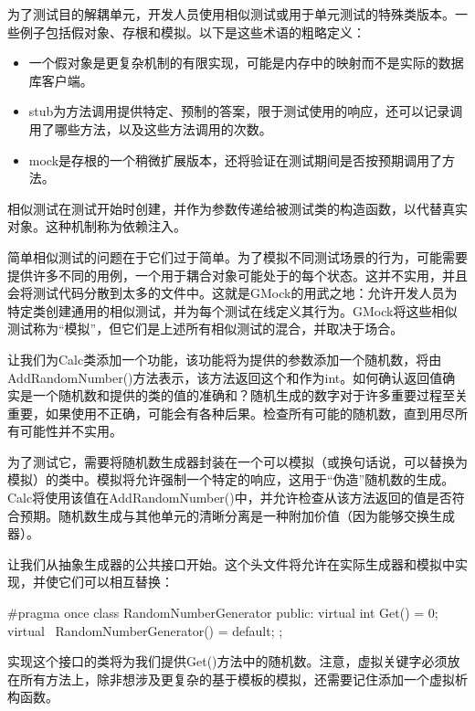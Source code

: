 为了测试目的解耦单元，开发人员使用相似测试或用于单元测试的特殊类版本。一些例子包括假对象、存根和模拟。以下是这些术语的粗略定义：

\begin{itemize}
\item
一个假对象是更复杂机制的有限实现，可能是内存中的映射而不是实际的数据库客户端。

\item
stub为方法调用提供特定、预制的答案，限于测试使用的响应，还可以记录调用了哪些方法，以及这些方法调用的次数。

\item
mock是存根的一个稍微扩展版本，还将验证在测试期间是否按预期调用了方法。
\end{itemize}

相似测试在测试开始时创建，并作为参数传递给被测试类的构造函数，以代替真实对象。这种机制称为依赖注入。

简单相似测试的问题在于它们过于简单。为了模拟不同测试场景的行为，可能需要提供许多不同的用例，一个用于耦合对象可能处于的每个状态。这并不实用，并且会将测试代码分散到太多的文件中。这就是GMock的用武之地：允许开发人员为特定类创建通用的相似测试，并为每个测试在线定义其行为。GMock将这些相似测试称为“模拟”，但它们是上述所有相似测试的混合，并取决于场合。

让我们为Calc类添加一个功能，该功能将为提供的参数添加一个随机数，将由AddRandomNumber()方法表示，该方法返回这个和作为int。如何确认返回值确实是一个随机数和提供的类的值的准确和？随机生成的数字对于许多重要过程至关重要，如果使用不正确，可能会有各种后果。检查所有可能的随机数，直到用尽所有可能性并不实用。

为了测试它，需要将随机数生成器封装在一个可以模拟（或换句话说，可以替换为模拟）的类中。模拟将允许强制一个特定的响应，这用于“伪造”随机数的生成。Calc将使用该值在AddRandomNumber()中，并允许检查从该方法返回的值是否符合预期。随机数生成与其他单元的清晰分离是一种附加价值（因为能够交换生成器）。

让我们从抽象生成器的公共接口开始。这个头文件将允许在实际生成器和模拟中实现，并使它们可以相互替换：


\begin{cmake}
#pragma once
class RandomNumberGenerator {
    public:
    virtual int Get() = 0;
    virtual ~RandomNumberGenerator() = default;
};
\end{cmake}

实现这个接口的类将为我们提供Get()方法中的随机数。注意，虚拟关键字必须放在所有方法上，除非想涉及更复杂的基于模板的模拟，还需要记住添加一个虚拟析构函数。

